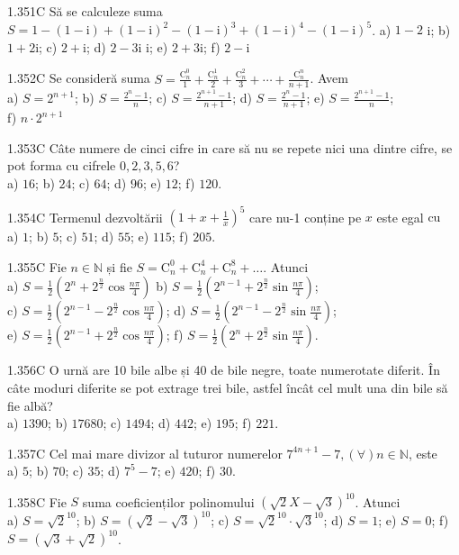 \documentclass[11pt]{article}
\begin{document}
1.351C Să se calculeze suma $S=1-(1-\mathrm{i})+(1-\mathrm{i})^{2}-(1-\mathrm{i})^{3}+(1-\mathrm{i})^{4}-(1-\mathrm{i})^{5}$. a) $1-2$ i; b) $1+2 \mathrm{i}$; c) $2+\mathrm{i}$; d) $2-3 \mathrm{i}$ i; e) $2+3 \mathrm{i}$; f) $2-\mathrm{i}$

1.352C Se consideră suma $S=\frac{\mathrm{C}_{n}^{0}}{1}+\frac{\mathrm{C}_{n}^{1}}{2}+\frac{\mathrm{C}_{n}^{2}}{3}+\cdots+\frac{\mathrm{C}_{n}^{n}}{n+1}$. Avem\\ a) $S=2^{n+1}$; b) $S=\frac{2^{n}-1}{n}$; c) $S=\frac{2^{n+1}-1}{n+1}$; d) $S=\frac{2^{n}-1}{n+1}$; e) $S=\frac{2^{n+1}-1}{n}$;\\ f) $n \cdot 2^{n+1}$

1.353C Câte numere de cinci cifre in care să nu se repete nici una dintre cifre, se pot forma cu cifrele $0,2,3,5,6$?\\ a) $16$; b) $24$; c) $64$; d) $96$; e) $12$; f) $120$.

1.354C Termenul dezvoltării $\left(1+x+\frac{1}{x}\right)^{5}$ care nu-1 conține pe $x$ este egal $\mathrm{cu}$\\ a) $1$; b) $5$; c) $51$; d) $55$; e) $115$; f) $205$.

1.355C Fie $n \in \mathbb{N}$ și fie $S=\mathrm{C}_{n}^{0}+\mathrm{C}_{n}^{4}+\mathrm{C}_{n}^{8}+\ldots$. Atunci\\ a) $S=\frac{1}{2}\left(2^{n}+2^{\frac{n}{2}} \cos \frac{n \pi}{4}\right)$ b) $S=\frac{1}{2}\left(2^{n-1}+2^{\frac{n}{2}} \sin \frac{n \pi}{4}\right)$;\\ c) $S=\frac{1}{2}\left(2^{n-1}-2^{\frac{n}{2}} \cos \frac{n \pi}{4}\right)$; d) $S=\frac{1}{2}\left(2^{n-1}-2^{\frac{n}{2}} \sin \frac{n \pi}{4}\right)$;\\ e) $S=\frac{1}{2}\left(2^{n-1}+2^{\frac{n}{2}} \cos \frac{n \pi}{4}\right)$; f) $S=\frac{1}{2}\left(2^{n}+2^{\frac{n}{2}} \sin \frac{n \pi}{4}\right)$.

1.356C O urnă are 10 bile albe și 40 de bile negre, toate numerotate diferit. În câte moduri diferite se pot extrage trei bile, astfel încât cel mult una din bile să fie albă?\\ a) $1390$; b) $17680$; c) $1494$; d) $442$; e) $195$; f) $221$.

1.357C Cel mai mare divizor al tuturor numerelor $7^{4 n+1}-7,(\forall) n \in \mathbb{N}$, este\\ a) $5$; b) $70$; c) $35$; d) $7^{5}-7$; e) $420$; f) $30$.

1.358C Fie $S$ suma coeficienților polinomului $(\sqrt{2} X-\sqrt{3})^{10}$. Atunci\\ a) $S=\sqrt{2}^{10}$; b) $S=(\sqrt{2}-\sqrt{3})^{10}$; c) $S=\sqrt{2}^{10} \cdot \sqrt{3}^{10}$; d) $S=1$; e) $S=0$; f) $S=(\sqrt{3}+\sqrt{2})^{10}$.
\end{document}
